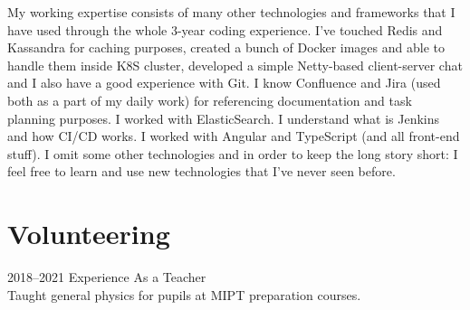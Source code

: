 \documentclass[]{cv-style}          %
\begin{document}
My working expertise consists of many other technologies and frameworks that I have used through the whole 3-year coding experience. I've touched Redis and Kassandra for caching purposes, created a bunch of Docker images and able to handle them inside K8S cluster, developed a simple Netty-based client-server chat and I also have a good experience with Git. I know Confluence and Jira (used both as a part of my daily work) for referencing documentation and task planning purposes. I worked with ElasticSearch. I understand what is Jenkins and how CI/CD works. I worked with Angular and TypeScript (and all front-end stuff). I omit some other technologies and in order to keep the long story short: I feel free to learn and use new technologies that I’ve never seen before.  



\section{Volunteering}

\begin{entrylist}

\entrySkoltech
    {2018--2021}
    {Experience As a Teacher}
    {\jobtitle{}\\
Taught general physics for pupils at MIPT preparation courses.}

\end{entrylist}





\end{document}
